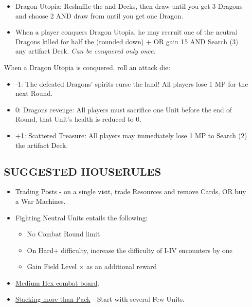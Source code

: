 \begin{multicols*}{2}
\begin{itemize}
  \item Dragon Utopia: Reshuffle the  and  Decks, then draw  until you get 3 Dragons and choose 2 AND draw from  until you get one Dragon. 
  \item When a player conquers Dragon Utopia, he may recruit one of the neutral Dragons killed for half the  (rounded down) +  OR gain 15  AND Search (3) any artifact Deck. \textit{Can be conquered only once.}
\end{itemize}

When a Dragon Utopia is conquered, roll an attack die:
\begin{itemize}
  \item -1: The defeated Dragons’ spirits curse the land! All players lose 1 MP for the next Round.
  \item  0: Dragons revenge: All players must sacrifice one Unit before the end of Round, that Unit's health is reduced to 0. 
  \item +1: Scattered Treasure: All players may immediately lose 1 MP to Search (2) the artifact Deck.
\end{itemize}

\subsection*{\MakeUppercase{Suggested Houserules}}
\begin{itemize}
  \item Trading Posts - on a single visit, trade Resources and remove Cards, OR buy a War Machines.
  \item Fighting Neutral Units entails the following:
  \begin{itemize}
    \item No Combat Round limit
    \item On Hard+ difficulty, increase the difficulty of I-IV encounters by one
    \item Gain Field Level ×  as an additional reward
  \end{itemize}
  \item \href{https://boardgamegeek.com/thread/3445901/custom-hex-combat-board}{Medium Hex combat board}.
  \item \href{https://boardgamegeek.com/thread/3449937/houserule-for-stacking-more-than-pack}{Stacking more than Pack} - Start with several Few  Units.
\end{itemize}

\vspace*{\fill}

\end{multicols*}


